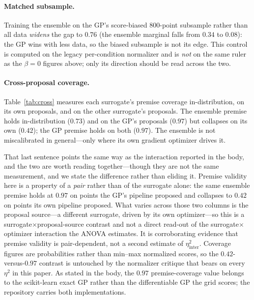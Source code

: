 \documentclass[letterpaper]{article}
\theoremstyle{plain}
\begin{document}
\paragraph{Matched subsample.} Training the ensemble on the GP's score-biased $800$-point subsample rather than all data \emph{widens} the gap to $0.76$ (the ensemble marginal falls from $0.34$ to $0.08$): the GP wins with less data, so the biased subsample is not its edge. This control is computed on the legacy per-condition normalizer and is \emph{not} on the same ruler as the $\beta{=}0$ figures above; only its direction should be read across the two.

\paragraph{Cross-proposal coverage.} Table~\ref{tab:cross} measures each surrogate's premise coverage in-distribution, on its own proposals, and on the other surrogate's proposals. The ensemble premise holds in-distribution ($0.73$) and on the GP's proposals ($0.97$) but collapses on its own ($0.42$); the GP premise holds on both ($0.97$). The ensemble is not miscalibrated in general---only where its own gradient optimizer drives it.

That last sentence points the same way as the interaction reported in the body, and the two are worth reading together---though they are not the same measurement, and we state the difference rather than eliding it. Premise validity here is a property of a \emph{pair} rather than of the surrogate alone: the same ensemble premise holds at $0.97$ on points the GP's pipeline proposed and collapses to $0.42$ on points its own pipeline proposed. What varies across those two columns is the proposal source---a different surrogate, driven by its own optimizer---so this is a surrogate$\times$proposal-source contrast and not a direct read-out of the surrogate$\times$optimizer interaction the ANOVA estimates. It is corroborating evidence that premise validity is pair-dependent, not a second estimate of $\eta^2_{\text{inter}}$. Coverage figures are probabilities rather than min--max normalized scores, so the $0.42$-versus-$0.97$ contrast is untouched by the normalizer critique that bears on every $\eta^2$ in this paper. As stated in the body, the $0.97$ premise-coverage value belongs to the scikit-learn exact GP rather than the differentiable GP the grid scores; the repository carries both implementations.
\end{document}
